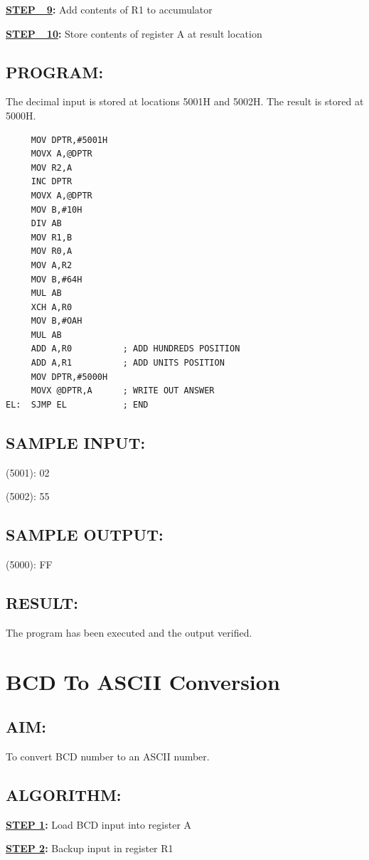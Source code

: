 \documentclass[a4paper,28pt]{report}
\begin{document}
\textbf{\underline{STEP\ \ 9}:} Add contents of R1 to accumulator

\textbf{\underline{STEP\ \ 10}:} Store contents of register A at result location

\section*{PROGRAM:}
The decimal input is stored at locations 5001H and 5002H. The result is stored at 5000H.

\begin{lstlisting}
     MOV DPTR,#5001H
     MOVX A,@DPTR
     MOV R2,A
     INC DPTR
     MOVX A,@DPTR
     MOV B,#10H
     DIV AB
     MOV R1,B
     MOV R0,A
     MOV A,R2
     MOV B,#64H
     MUL AB
     XCH A,R0
     MOV B,#OAH
     MUL AB
     ADD A,R0          ; ADD HUNDREDS POSITION
     ADD A,R1          ; ADD UNITS POSITION
     MOV DPTR,#5000H
     MOVX @DPTR,A      ; WRITE OUT ANSWER
EL:  SJMP EL           ; END
\end{lstlisting}
\section*{SAMPLE INPUT:}
(5001): 02

(5002): 55
\section*{SAMPLE OUTPUT:}
(5000): FF
\section*{RESULT:}
The program has been executed and the output verified.
%
%
\chapter{BCD To ASCII Conversion}
%
%
\section*{AIM:}
To convert BCD number to an ASCII number.

\section*{ALGORITHM:}

\textbf{\underline{STEP 1}:} Load BCD input into register A

\textbf{\underline{STEP 2}:} Backup input in register R1
\end{document}
